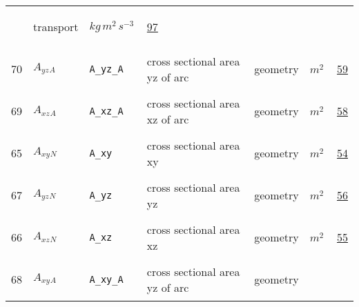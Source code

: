 \begin{longtable}{|p{1cm}|p{2.5cm}|p{4.5cm}|p{8cm}|p{3.0cm}|p{3cm}|p{1cm}|}
             & \begin{lay}transport \end{lay}
             & $ kg \,m^{2} \,s^{-3} \, $
             &                 \hyperlink{"e:97"}{ 97 }
                 \\
            70
             & \hypertarget{"v:70"}{ $ {{A_{yz}}}{_{A}} $}
             & \verb|A_yz_A|
             & cross sectional area yz of arc
             & \begin{lay}geometry \end{lay}
             & $ m^{2} \, $
             &                 \hyperlink{"e:59"}{ 59 }
                 \\
            69
             & \hypertarget{"v:69"}{ $ {{A_{xz}}}{_{A}} $}
             & \verb|A_xz_A|
             & cross sectional area xz of arc
             & \begin{lay}geometry \end{lay}
             & $ m^{2} \, $
             &                 \hyperlink{"e:58"}{ 58 }
                 \\
            65
             & \hypertarget{"v:65"}{ $ {{A_{xy}}}{_{N}} $}
             & \verb|A_xy|
             & cross sectional area xy
             & \begin{lay}geometry \end{lay}
             & $ m^{2} \, $
             &                 \hyperlink{"e:54"}{ 54 }
                 \\
            67
             & \hypertarget{"v:67"}{ $ {{A_{yz}}}{_{N}} $}
             & \verb|A_yz|
             & cross sectional area yz
             & \begin{lay}geometry \end{lay}
             & $ m^{2} \, $
             &                 \hyperlink{"e:56"}{ 56 }
                 \\
            66
             & \hypertarget{"v:66"}{ $ {{A_{xz}}}{_{N}} $}
             & \verb|A_xz|
             & cross sectional area xz
             & \begin{lay}geometry \end{lay}
             & $ m^{2} \, $
             &                 \hyperlink{"e:55"}{ 55 }
                 \\
            68
             & \hypertarget{"v:68"}{ $ {{A_{xy}}}{_{A}} $}
             & \verb|A_xy_A|
             & cross sectional area yz of arc
             & \begin{lay}geometry \end{lay}

\end{longtable}
